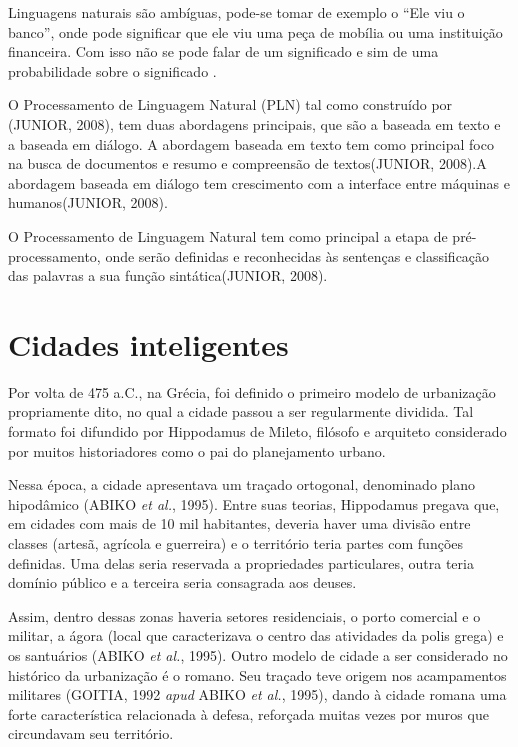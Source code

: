 Linguagens naturais são ambíguas, pode-se tomar de exemplo o “Ele viu o banco”, onde pode significar que ele viu uma peça de mobília ou uma instituição financeira. Com isso não se pode falar de um significado e sim de uma probabilidade sobre o significado \cite{inteligencia-artificial}.

O Processamento de Linguagem Natural (PLN) tal como construído por (JUNIOR, 2008), tem duas abordagens principais, que são a baseada em texto e a baseada em diálogo. A abordagem baseada em texto tem como principal foco na busca de documentos e resumo e compreensão de textos(JUNIOR, 2008).A abordagem baseada em diálogo tem crescimento com a interface entre máquinas e humanos(JUNIOR, 2008). 

O Processamento de Linguagem Natural tem como principal a etapa de pré-processamento, onde serão definidas e reconhecidas às sentenças e classificação das palavras a sua função sintática(JUNIOR, 2008).

\section{Cidades inteligentes} \label{s:cidades_inteligentes}

Por volta de 475 a.C., na Grécia, foi definido o primeiro modelo de urbanização propriamente dito, no qual a cidade passou a ser regularmente dividida. Tal formato foi difundido por Hippodamus de Mileto, filósofo e arquiteto considerado por muitos historiadores como o pai do planejamento urbano.

Nessa época, a cidade apresentava um traçado ortogonal, denominado plano hipodâmico (ABIKO \textit{et al.}, 1995). Entre suas teorias, Hippodamus pregava que, em cidades com mais de 10 mil habitantes, deveria haver uma divisão entre classes (artesã, agrícola e guerreira) e o território teria partes com funções definidas. Uma delas seria reservada a propriedades particulares, outra teria domínio público e a terceira seria consagrada aos deuses.

Assim, dentro dessas zonas haveria setores residenciais, o porto comercial e o militar, a ágora (local que caracterizava o centro das atividades da polis grega) e os santuários (ABIKO \textit{et al.}, 1995).
Outro modelo de cidade a ser considerado no histórico da urbanização é o romano. Seu traçado teve origem nos acampamentos militares (GOITIA, 1992 \textit{apud} ABIKO \textit{et al.}, 1995), dando à cidade romana uma forte característica relacionada à defesa, reforçada muitas vezes por muros que circundavam seu território.

